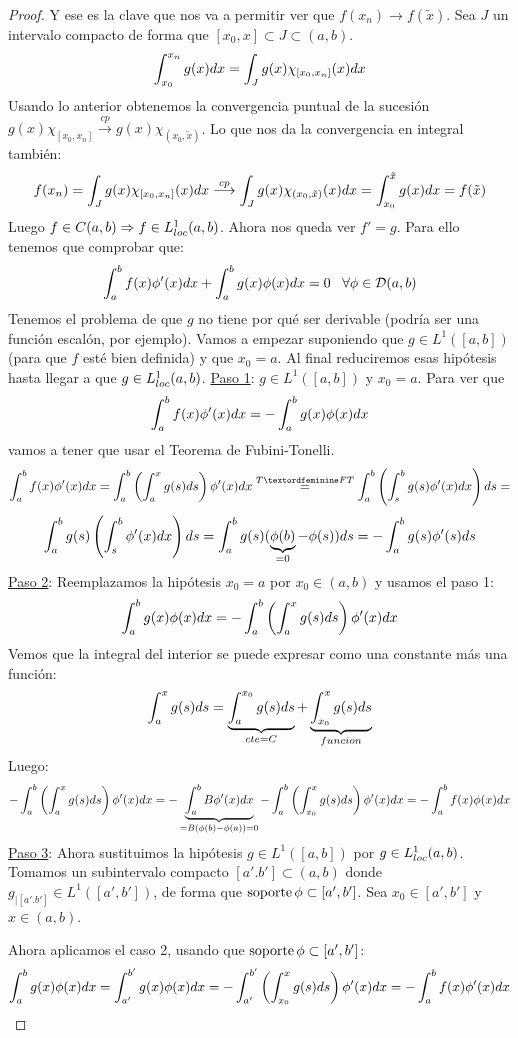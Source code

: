 \begin{proof}
Y ese es la clave que nos va a permitir ver que $f(x_n)\to f(\tilde{x})$. Sea $J$ un intervalo compacto de forma que $[x_0,x]\subset J\subset(a,b)$.
\[
\displaystyle\int_{ x_0 }^{ x_n } g(x)dx=\displaystyle\int_{ J }^{  } g(x)\chi_{[x_0,x_n]}(x)dx
\]
Usando lo anterior obtenemos la convergencia puntual de la sucesión $g(x)\chi_{[x_0,x_n]}\overset{cp}{\longrightarrow}g(x)\chi_{(x_0,\tilde{x})}$. Lo que nos da la convergencia en integral también:
\[
f(x_n)=\displaystyle\int_{ J }^{  } g(x)\chi_{[x_0,x_n]}(x)dx\overset{cp}{\longrightarrow}\displaystyle\int_{ J }^{  } g(x)\chi_{(x_0,\tilde{x})}(x)dx=\displaystyle\int_{ x_0 }^{ \tilde{x} } g(x)dx=f(\tilde{x})
\]
Luego $f\in C(a,b) \Rightarrow f\in L^1_{loc}(a,b)$.
Ahora nos queda ver $f'=g$. Para ello tenemos que comprobar que:
\[
\displaystyle\int_{ a }^{ b } f(x)\phi'(x)dx+\displaystyle\int_{ a }^{ b } g(x)\phi(x)dx=0 \;\;\; \forall \phi\in \mathcal{D}(a,b)
\]
Tenemos el problema de que $g$ no tiene por qué ser derivable (podría ser una función escalón, por ejemplo). Vamos a empezar suponiendo que $g\in L^1([a,b])$ (para que $f$ esté bien definida) y que $x_0=a$. Al final reduciremos esas hipótesis hasta llegar a que $g\in L^1_{loc}(a,b)$.
\underline{Paso 1}: $g\in L^1([a,b])$ y $x_0=a$. Para ver que
\[
\displaystyle\int_{ a }^{ b } f(x)\phi'(x)dx=-\displaystyle\int_{ a }^{ b } g(x)\phi(x)dx 
\]
vamos a tener que usar el Teorema de Fubini-Tonelli.
\[
\integral{a}{b}{f(x)\phi'(x)dx}=
\integral{a}{b}{\left(\integral{a}{x}{g(s)ds}\right)\phi'(x)dx}\overset{TªFT}{=}
\integral{a}{b}{\left(\integral{s}{b}{g(s)\phi'(x)dx}\right)ds}=\]
\[
\displaystyle\int_{ a }^{ b } g(s)\left(\displaystyle\int_{ s }^{ b } \phi'(x)dx\right)ds
=\displaystyle\int_{ a }^{ b } g(s)(\underbrace{\phi(b)}_{=0}-\phi(s))ds=-\displaystyle\int_{ a }^{ b } g(s)\phi'(s)ds
\]
\underline{Paso 2}: Reemplazamos la hipótesis $x_0=a$ por $x_0\in(a,b)$ y usamos el paso 1:
\[
\displaystyle\int_{ a }^{ b } g(x)\phi(x)dx=-\displaystyle\int_{ a }^{ b } \left(\displaystyle\int_{ a }^{ x } g(s)ds\right)\phi'(x)dx
\]
Vemos que la integral del interior se puede expresar como una constante más una función:
\[
\displaystyle\int_{ a }^{ x } g(s)ds=\underbrace{\displaystyle\int_{ a }^{ x_0 } g(s)ds}_{cte=C}+\underbrace{\displaystyle\int_{ x_0 }^{ x } g(s)ds}_{funcion}
\]
Luego:
\[
-\displaystyle\int_{ a }^{ b } \left(\displaystyle\int_{ a }^{ x } g(s)ds\right)\phi'(x)dx=
-\underbrace{\displaystyle\int_{ a }^{ b } B\phi'(x)dx}_{=B(\phi(b)-\phi(a))=0}-\displaystyle\int_{ a }^{ b } \left(\displaystyle\int_{ x_0 }^{ x } g(s)ds\right)\phi'(x)dx=
-\displaystyle\int_{ a }^{ b } f(x)\phi(x)dx
\]
\underline{Paso 3}: Ahora sustituimos la hipótesis $g\in L^1([a,b])$ por $g\in L^1_{loc}(a,b)$. Tomamos un subintervalo compacto $[a'.b']\subset(a,b)$ donde $g_{|[a'.b']}\in L^1([a',b'])$, de forma que $\operatorname{soporte}\phi\subset[a',b']$. Sea $x_0\in[a',b']$ y $x\in(a,b)$.

Ahora aplicamos el caso 2, usando que $\operatorname{soporte}\phi\subset[a',b']$:
\[
\displaystyle\int_{ a }^{ b } g(x)\phi(x)dx=\displaystyle\int_{ a' }^{ b' } g(x)\phi(x)dx=-\displaystyle\int_{ a' }^{ b' } \left(\displaystyle\int_{ x_0 }^{ x } g(s)ds\right)\phi'(x)dx=-\displaystyle\int_{ a }^{ b } f(x)\phi'(x)dx
\]
\end{proof}

